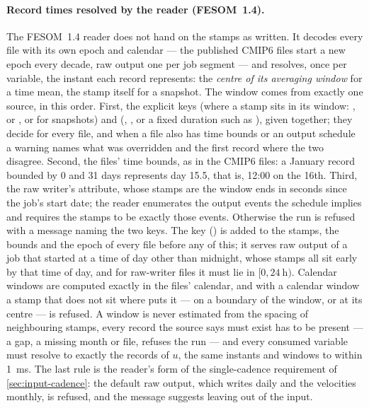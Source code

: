 \paragraph{Record times resolved by the reader (FESOM~1.4).} The FESOM~1.4 reader does not hand on the
stamps as written. It decodes every file with its own epoch and calendar --- the published CMIP6 files start a
new epoch every decade, raw output one per job segment --- and resolves, once per variable, the instant each
record represents: the \emph{centre of its averaging window} for a time mean, the stamp itself for a
snapshot. The window comes from exactly one source, in this order. First, the explicit keys
 (where a stamp sits in its window: ,  or , or
 for snapshots) and  (, ,
 or a fixed duration such as ), given together; they decide for every file,
and when a file also has time bounds or an output schedule a warning names what was overridden and the
first record where the two disagree. Second, the files' time bounds, as in the CMIP6 files: a January record
bounded by 0 and 31 days represents day 15.5, that is, 12:00 on the 16th. Third, the raw writer's
 attribute, whose stamps are the window ends in seconds since the job's start date; the
reader enumerates the output events the schedule implies and requires the stamps to be exactly those events.
Otherwise the run is refused with a message naming the two keys. The key 
() is added to the stamps, the bounds and the epoch of every file before any
of this; it serves raw output of a job that started at a time of day other than midnight, whose stamps all sit
early by that time of day, and for raw-writer files it must lie in $[0,\SI{24}{\hour})$. Calendar windows are
computed exactly in the files' calendar, and with a calendar window a stamp that does not sit where
 puts it --- on a boundary of the window, or at its centre --- is refused. A window is never estimated from the spacing of neighbouring stamps, every record the source says must
exist has to be present --- a gap, a missing month or file, refuses the run --- and every consumed variable
must resolve to exactly the records of $u$, the same instants and windows to within \SI{1}{\milli\second}. The
last rule is the reader's form of the single-cadence requirement of \cref{sec:input-cadence}: the default raw
output, which writes  daily and the velocities monthly, is refused, and the message suggests leaving
 out of the input.

